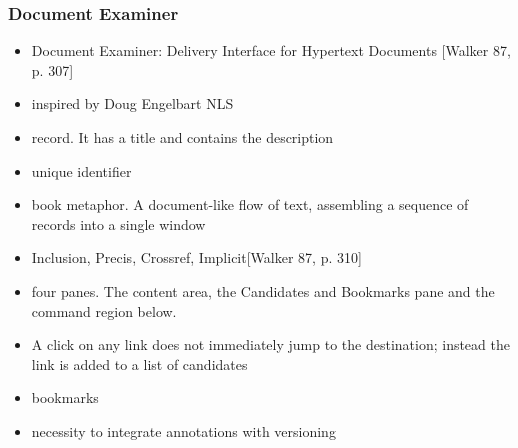 \begin{frame}
\frametitle{Document Examiner}
\begin{itemize}
	\item Document Examiner: Delivery Interface for Hypertext Documents [Walker 87, p. 307]
	\item inspired by Doug Engelbart NLS
	\item record. It has a title and contains the description
	\item unique identifier
	\item book metaphor. A document-like flow of text, assembling a sequence of records into a single window
	\item Inclusion, Precis, Crossref, Implicit[Walker 87, p. 310]
	\item four panes. The content area, the Candidates and Bookmarks pane and the command region below.
	\item A click on any link does not immediately jump to the destination; instead the link is added to a list of candidates
	\item bookmarks 
	\item necessity to integrate annotations with versioning
\end{itemize}

\end{frame}
